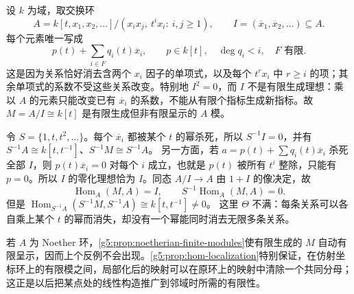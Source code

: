 \begin{example}\label{g5:exm:hom-localization-failure}
	设 \(k\) 为域，取交换环
	\[
		A=k[t,x_1,x_2,\ldots]\big/
		(x_ix_j,\ t^i x_i:\ i,j\geq1),
		\qquad I=(\overline x_1,\overline x_2,\ldots)\subseteq A.
	\]
	每个元素唯一写成
	\[
		p(t)+\sum_{i\in F}q_i(t)\overline x_i,\qquad
		p\in k[t],\quad \deg q_i<i,\quad F\text{ 有限}.
	\]
	这是因为关系恰好消去含两个 \(x_i\) 因子的单项式，以及每个 \(t^r x_i\) 中 \(r\geq i\) 的项；其余单项式的系数不受这些关系改变。特别地 \(I^2=0\)，而 \(I\) 不是有限生成理想：乘以 \(A\) 的元素只能改变已有 \(\overline x_i\) 的系数，不能从有限个指标生成新指标。故 \(M=A/I\cong k[t]\) 是有限生成但非有限呈示的 \(A\) 模。

	令 \(S=\{1,t,t^2,\ldots\}\)。每个 \(\overline x_i\) 都被某个 \(t\) 的幂杀死，所以 \(S^{-1}I=0\)，并有
	\(S^{-1}A\cong k[t,t^{-1}]\)、\(S^{-1}M\cong S^{-1}A\)。
	另一方面，若 \(a=p(t)+\sum q_i(t)\overline x_i\) 杀死全部 \(I\)，则 \(p(t)\overline x_i=0\) 对每个 \(i\) 成立，也就是 \(p(t)\) 被所有 \(t^i\) 整除，只能有 \(p=0\)。所以 \(I\) 的零化理想恰为 \(I\)。同态 \(A/I\rightarrow A\) 由 \(1+I\) 的像决定，故
	\[
		\operatorname{Hom}_A(M,A)=I,\qquad
		S^{-1}\operatorname{Hom}_A(M,A)=0.
	\]
	但是
	\(\operatorname{Hom}_{S^{-1}A}(S^{-1}M,S^{-1}A)\cong k[t,t^{-1}]\ne0\)。
	这里 \(\Theta\) 不满：每条关系可以各自乘上某个 \(t\) 的幂而消失，却没有一个幂能同时消去无限多条关系。
\end{example}

若 \(A\) 为 Noether 环，\cref{g5:prop:noetherian-finite-modules}使有限生成的 \(M\) 自动有限呈示，因而上个反例不会出现。\cref{g5:prop:hom-localization}特别保证，在仿射坐标环上的有限模之间，局部化后的映射可以在原环上的映射中清除一个共同分母；这正是以后把某点处的线性构造推广到邻域时所需的有限性。

